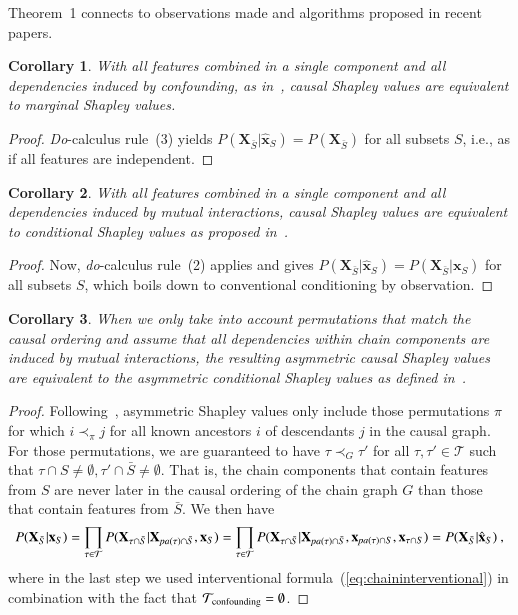 \documentclass{article}
\newcommand{\vX}{\mathbf{X}}
\newcommand{\vx}{\mathbf{x}}
\newcommand{\svdo}[1]{\hat{\vx}_{#1}}
\newcommand{\spa}{\mathop{\textit{\scriptsize pa}}}
\newcommand{\perm}{\pi}
\newcommand{\onder}[2]{{#1}_{\mbox{\scriptsize #2}}}
\newcommand{\chaincomponents}{{\cal T}}
\newtheorem{corollary}{Corollary}
\begin{document}
Theorem~1 connects to observations made and algorithms proposed in recent papers.
\begin{corollary}
	With all features combined in a single component and all dependencies induced by confounding, as in~\cite{janzing2019feature}, causal Shapley values are equivalent to marginal Shapley values. 
\end{corollary}
\begin{proof}
	{\em Do}-calculus rule~(3) yields $P(\vX_{\bar{S}}|\svdo{S}) = P(\vX_{\bar{S}})$ for all subsets $S$, i.e., as if all features are independent.
\end{proof}
\begin{corollary}
	With all features combined in a single component and all dependencies induced by mutual interactions, causal Shapley values are equivalent to conditional Shapley values as proposed in~\cite{aas2019explaining}.
\end{corollary}
\begin{proof}
	Now, {\em do}-calculus rule~(2) applies and gives $P(\vX_{\bar{S}}|\svdo{S}) = P(\vX_{\bar{S}}|\vx_{S})$ for all subsets $S$, which boils down to conventional conditioning by observation.
\end{proof}
\begin{corollary}
	When we only take into account permutations that match the causal ordering and assume that all dependencies within chain components are induced by mutual interactions, the resulting asymmetric causal Shapley values are equivalent to the asymmetric conditional Shapley values as defined in~\cite{frye2019asymmetric}.
\end{corollary}
\begin{proof}
	Following~\cite{frye2019asymmetric}, asymmetric Shapley values only include those permutations $\perm$ for which $i \prec_\perm j$ for all known ancestors $i$ of descendants $j$ in the causal graph. For those permutations, we are guaranteed to have $\tau \prec_G \tau'$ for all $\tau, \tau' \in \mathcal{T}$ such that $\tau \cap S \neq \emptyset, \tau' \cap \bar{S} \neq \emptyset$. That is, the chain components that contain features from $S$ are never later in the causal ordering of the chain graph $G$ than those that contain features from $\bar{S}$. We then have
	\[
	P(\vX_{\bar{S}}|\vx_S) = \prod_{\tau \in \chaincomponents} P(\vX_{\tau \cap \bar{S}}|\vX_{\spa(\tau)  \cap \bar{S}},\vx_{S}) = \prod_{\tau \in \chaincomponents} P(\vX_{\tau \cap \bar{S}}|\vX_{\spa(\tau)  \cap \bar{S}},\vx_{\spa(\tau) \cap S},\vx_{\tau \cap S}) = P(\vX_{\bar{S}}|\svdo{S}) \: ,
	\]
	where in the last step we used interventional formula~(\ref{eq:chaininterventional}) in combination with the fact that $\onder{\chaincomponents}{confounding} = \emptyset$.
\end{proof}
\end{document}
